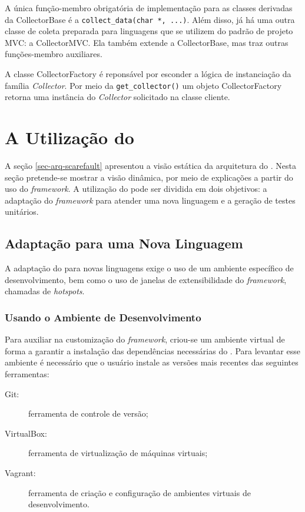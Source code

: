 A única função-membro obrigatória de implementação para as classes derivadas da
\textsf{CollectorBase} é a \lstinline|collect_data(char *, ...)|. Além disso, já
há uma outra classe de coleta preparada para linguagens que se utilizem do padrão
de projeto MVC: a \textsf{CollectorMVC}. Ela também extende a \textsf{CollectorBase},
mas traz outras funções-membro auxiliares.

A classe \textsf{CollectorFactory} é reponsável por esconder a lógica de instanciação
da família \textit{Collector}. Por meio da \lstinline|get_collector()| um objeto
\textsf{CollectorFactory} retorna uma instância do \textit{Collector} solicitado na
classe cliente.

\section{A Utilização do \Scarefault}
A seção \ref{sec-arq-scarefault} apresentou a visão estática da arquitetura do
\Scarefault. Nesta seção pretende-se mostrar a visão dinâmica, por meio
de explicações a partir do uso do \textit{framework}. A utilização do
\scarefault pode ser dividida em dois objetivos: a adaptação
do \textit{framework} para atender uma nova linguagem e a geração de testes unitários.
 
\subsection{Adaptação para uma Nova Linguagem}
A adaptação do \scarefault para novas linguagens exige o uso de um ambiente
específico de desenvolvimento, bem como o uso de janelas de extensibilidade
do \textit{framework}, chamadas de \textit{hotspots}.

\subsubsection{Usando o Ambiente de Desenvolvimento}
Para auxiliar na customização do \textit{framework}, criou-se um ambiente
virtual de forma a garantir a instalação das dependências necessárias do
\Scarefault. Para levantar esse ambiente é necessário que o usuário instale as
versões mais recentes das seguintes ferramentas: 

\begin{description}
\item[Git:] ferramenta de controle de versão;
\item[VirtualBox:] ferramenta de virtualização de máquinas virtuais;
\item[Vagrant:] ferramenta de criação e configuração de ambientes virtuais de desenvolvimento.
\end{description} 

